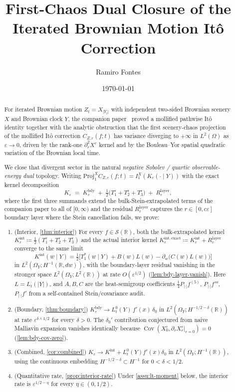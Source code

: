 \documentclass[11pt,reqno]{amsart}
\title{First-Chaos Dual Closure of the\\
       Iterated Brownian Motion It\^o Correction}
\author{Ramiro Fontes}
\date{\today}
\theoremstyle{plain}
\theoremstyle{definition}
\theoremstyle{remark}
\newcommand{\R}{\mathbb{R}}
\newcommand{\IBM}{Z}
\DeclareMathOperator{\Cov}{Cov}
\begin{document}
\begin{abstract}
For iterated Brownian motion $\IBM_t=X_{|Y_t|}$ with independent
two-sided Brownian scenery $X$ and Brownian clock $Y$, the companion
paper~\cite{Fontes-EnergyFirst} proved a mollified pathwise It\^o
identity together with the analytic obstruction that the first
scenery-chaos projection of the mollified It\^o correction
$C_{\IBM,\varepsilon}(f;t)$ has variance diverging to $+\infty$ in
$L^{2}(\Omega)$ as $\varepsilon\to 0$, driven by the rank-one
$\partial_{r}^{2}X^{\varepsilon}$ kernel and by the Bouleau--Yor
spatial quadratic variation of the Brownian local time.

We close that divergent sector in the natural \emph{negative Sobolev
/ quartic observable-energy dual} topology. Writing
$\mathrm{Proj}_{1}^{X}C_{\IBM,\varepsilon}(f;t)=I_{1}^{X}(K_{\varepsilon}(\cdot\mid Y))$
with the exact kernel decomposition
\[
 K_{\varepsilon}\;=\;K_{\varepsilon}^{\mathrm{bdy}}
 \;+\;\tfrac12\bigl(T_{1}^{\varepsilon}+T_{2}^{\varepsilon}+T_{3}^{\varepsilon}\bigr)
 \;+\;R_{\varepsilon}^{\mathrm{layer}},
\]
where the first three summands extend the
bulk-Stein-extrapolated terms of the companion paper to all of
$[0,\infty)$ and the residual $R_{\varepsilon}^{\mathrm{layer}}$
captures the $r\in[0,c\varepsilon]$ boundary layer where the Stein
cancellation fails, we prove:
\begin{enumerate}
\item (Interior, \cref{thm:interior}) For every $f\in\mathscr S(\R)$,
both the bulk-extrapolated kernel
$K_{\varepsilon}^{\mathrm{int}}\coloneqq\tfrac12(T_{1}^{\varepsilon}+T_{2}^{\varepsilon}+T_{3}^{\varepsilon})$
and the actual interior kernel
$K_{\varepsilon}^{\mathrm{int,exact}}\coloneqq K_{\varepsilon}^{\mathrm{int}}+R_{\varepsilon}^{\mathrm{layer}}$
converge to the same limit
\[
 K^{\mathrm{int}}(w\mid Y)=\tfrac12\bigl[T_{1}^{*}(w\mid Y)
 +B(w)L(w)-\partial_{w}\!\bigl(C(w)L(w)\bigr)\bigr]
\]
in $L^{2}(\Omega_{Y};H^{-1}(\R,dw))$, with the boundary-layer
residual vanishing in the stronger space
$L^{2}(\Omega_{Y};L^{2}(\R))$ at rate $O(\varepsilon^{1/2})$
(\cref{lem:bdy-layer-vanish}). Here $L=L_{t}^{\cdot}(|Y|)$, and
$A,B,C$ are the heat-semigroup coefficients
$\tfrac14P_{|\cdot|}f^{(5)}$, $P_{|\cdot|}f'''$, $P_{|\cdot|}f'$
from a self-contained Stein/covariance audit.
\item (Boundary, \cref{thm:boundary})
$K_{\varepsilon}^{\mathrm{bdy}}\to L_{t}^{0}(Y)\,f'(x)\,\delta_{0}$ in
$L^{2}(\Omega_{Y};H^{-1/2-\delta}(\R))$ at rate
$\varepsilon^{\delta\wedge 1/2}$ for every $\delta>0$. The
$\delta_{0}'$ contribution conjectured from naive Malliavin
expansion vanishes identically because
$\Cov(X_{0}^{\varepsilon},\partial_{r}X_{r}^{\varepsilon}|_{r=0})=0$
(\cref{lem:bdy-cov-zero}).
\item (Combined, \cref{cor:combined})
$K_{\varepsilon}\to K^{\mathrm{int}}+L_{t}^{0}(Y)f'(x)\delta_{0}$ in
$L^{2}(\Omega_{Y};H^{-1}(\R))$, using the continuous embedding
$H^{-1/2-\delta}\subset H^{-1}$ for $0<\delta<1/2$.
\item (Quantitative rate, \cref{prop:interior-rate}) Under
\cref{assu:lt-moment} below, the interior rate is
$\varepsilon^{1/2-\eta}$ for every $\eta\in(0,1/2)$.
\end{enumerate}


\end{abstract}
\end{document}
